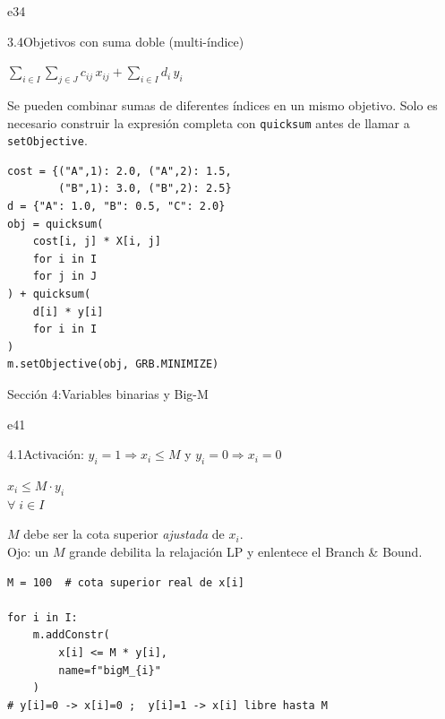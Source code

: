 \documentclass[10pt,a4paper]{article}
\newlength{\mathcolw}
\newlength{\codecolw}
\newcommand{\secheader}[2]{%
  \vspace{10pt}%
  \needspace{6cm}%
  \phantomsection\hypertarget{sec#1}{}%
  \noindent%
  \begin{tcolorbox}[
    colback=sectionbg, colupper=white,
    colframe=sectionbg, sharp corners,
    left=8pt, right=8pt, top=5pt, bottom=5pt,
    fontupper=\large\bfseries\sffamily,
  ]
  Secci\'on #1:\enspace #2
  \end{tcolorbox}%
  \vspace{2pt}%
}
\newcommand{\entryheader}[2][]{%
  \needspace{5cm}%
  \vspace{6pt}%
  \ifx\relax#1\relax\else\phantomsection\hypertarget{#1}{}\fi%
  \noindent%
  \begin{tcolorbox}[
    colback=subsecbg!18,
    colframe=subsecbg!45,
    sharp corners, boxrule=0.4pt,
    left=5pt, right=5pt, top=2pt, bottom=2pt,
    fontupper=\small\bfseries\sffamily,
  ]
  #2
  \end{tcolorbox}%
  \vspace{2pt}%
}
\newcommand{\py}[1]{\texttt{\small #1}}
\begin{document}
\entryheader[e34]{3.4\quad Objetivos con suma doble (multi-\'indice)}
\noindent
\begin{minipage}[t]{\mathcolw}
    \begin{tcolorbox}[mathbox]
        $\displaystyle\sum_{i \in I}\sum_{j \in J} c_{ij}\, x_{ij} + \sum_{i \in I} d_i\, y_i$
    \end{tcolorbox}
    \vspace{2pt}
    \begin{tcolorbox}[notebox]
        Se pueden combinar sumas de diferentes \'indices en un mismo objetivo. Solo es necesario construir la expresi\'on completa con \py{quicksum} antes de llamar a \py{setObjective}.
    \end{tcolorbox}
\end{minipage}\hspace{0.02\textwidth}%
\begin{minipage}[t]{\codecolw}
    \begin{lstlisting}[style=gurobipy]
cost = {("A",1): 2.0, ("A",2): 1.5,
        ("B",1): 3.0, ("B",2): 2.5}
d = {"A": 1.0, "B": 0.5, "C": 2.0}
obj = quicksum(
    cost[i, j] * X[i, j]
    for i in I
    for j in J
) + quicksum(
    d[i] * y[i]
    for i in I
)
m.setObjective(obj, GRB.MINIMIZE)
\end{lstlisting}
\end{minipage}

\vspace{4pt}
\secheader{4}{Variables binarias y Big-M}

\entryheader[e41]{4.1\quad Activaci\'on: $y_i = 1 \Rightarrow x_i \leq M$ y $y_i = 0 \Rightarrow x_i = 0$}
\noindent
\begin{minipage}[t]{\mathcolw}
    \begin{tcolorbox}[mathbox]
        $x_i \leq M \cdot y_i$\\[6pt]
        $\forall\; i \in I$
    \end{tcolorbox}
    \vspace{2pt}
    \begin{tcolorbox}[notebox]
        $M$ debe ser la cota superior \emph{ajustada} de $x_i$.\\
        Ojo: un $M$ grande debilita la relajaci\'on LP y enlentece el Branch \& Bound.
    \end{tcolorbox}
\end{minipage}\hspace{0.02\textwidth}%
\begin{minipage}[t]{\codecolw}
    \begin{lstlisting}[style=gurobipy]
M = 100  # cota superior real de x[i]

for i in I:
    m.addConstr(
        x[i] <= M * y[i],
        name=f"bigM_{i}"
    )
# y[i]=0 -> x[i]=0 ;  y[i]=1 -> x[i] libre hasta M
\end{lstlisting}
\end{minipage}
\end{document}
